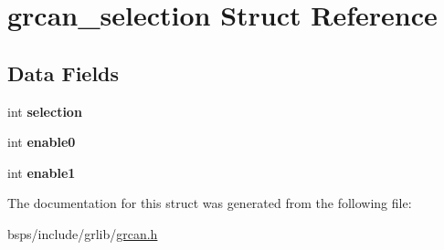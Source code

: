 \hypertarget{structgrcan__selection}{}\section{grcan\+\_\+selection Struct Reference}
\label{structgrcan__selection}
\subsection*{Data Fields}
\begin{DoxyCompactItemize}
\item 
\mbox{\label{structgrcan__selection_a8dd42d95b20ce78799a5199bfde1e468}} 
int {\bfseries selection}
\item 
\mbox{\label{structgrcan__selection_a9313988f741775c64f08f3cc12d9796a}} 
int {\bfseries enable0}
\item 
\mbox{\label{structgrcan__selection_a0b5415aa20b33b881913d973f5bea1c5}} 
int {\bfseries enable1}
\end{DoxyCompactItemize}


The documentation for this struct was generated from the following file\+:\begin{DoxyCompactItemize}
\item 
bsps/include/grlib/\mbox{\hyperlink{grcan_8h}{grcan.\+h}}\end{DoxyCompactItemize}

